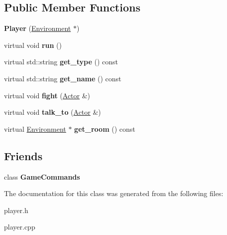 \subsection*{Public Member Functions}
\begin{DoxyCompactItemize}
\item 
\hypertarget{classda__game_1_1Player_a9595c922f10179598390ceb4015bd2f4}{
{\bfseries Player} (\hyperlink{classda__game_1_1Environment}{Environment} $\ast$)}
\label{classda__game_1_1Player_a9595c922f10179598390ceb4015bd2f4}

\item 
\hypertarget{classda__game_1_1Player_a82953e4dd060cc994a466cc4396416bc}{
virtual void {\bfseries run} ()}
\label{classda__game_1_1Player_a82953e4dd060cc994a466cc4396416bc}

\item 
\hypertarget{classda__game_1_1Player_a3a7221090c308a8a72ef464b06f805a4}{
virtual std::string {\bfseries get\_\-type} () const }
\label{classda__game_1_1Player_a3a7221090c308a8a72ef464b06f805a4}

\item 
\hypertarget{classda__game_1_1Player_ac4525d9ce538a66f6f97678e20310e5e}{
virtual std::string {\bfseries get\_\-name} () const }
\label{classda__game_1_1Player_ac4525d9ce538a66f6f97678e20310e5e}

\item 
\hypertarget{classda__game_1_1Player_aff77ce1e994cf473bb35a2341f937f89}{
virtual void {\bfseries fight} (\hyperlink{classda__game_1_1Actor}{Actor} \&)}
\label{classda__game_1_1Player_aff77ce1e994cf473bb35a2341f937f89}

\item 
\hypertarget{classda__game_1_1Player_a6c0c3861b261abc16292c6bc74fbe39b}{
virtual void {\bfseries talk\_\-to} (\hyperlink{classda__game_1_1Actor}{Actor} \&)}
\label{classda__game_1_1Player_a6c0c3861b261abc16292c6bc74fbe39b}

\item 
\hypertarget{classda__game_1_1Player_a1bf7665cb71afb0d63c0c264496e9b44}{
virtual \hyperlink{classda__game_1_1Environment}{Environment} $\ast$ {\bfseries get\_\-room} () const }
\label{classda__game_1_1Player_a1bf7665cb71afb0d63c0c264496e9b44}

\end{DoxyCompactItemize}
\subsection*{Friends}
\begin{DoxyCompactItemize}
\item 
\hypertarget{classda__game_1_1Player_ad58162d418e52e78ef2d13bea08472d4}{
class {\bfseries GameCommands}}
\label{classda__game_1_1Player_ad58162d418e52e78ef2d13bea08472d4}

\end{DoxyCompactItemize}


The documentation for this class was generated from the following files:\begin{DoxyCompactItemize}
\item 
player.h\item 
player.cpp\end{DoxyCompactItemize}
